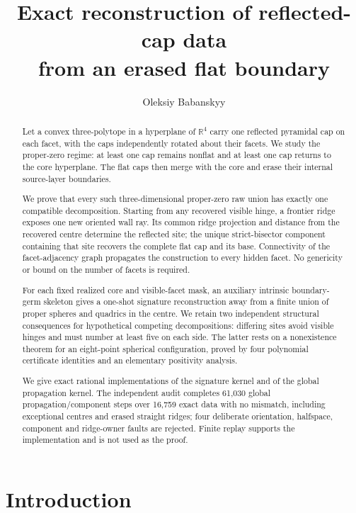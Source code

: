 \documentclass[11pt]{amsart}
\title[Reconstruction from an erased flat boundary]{Exact reconstruction of reflected-cap data\\from an erased flat boundary}
\author{Oleksiy Babanskyy}
\date{}
\theoremstyle{definition}
\newcommand{\R}{\mathbb{R}}
\begin{document}
\begin{abstract}
Let a convex three-polytope in a hyperplane of $\R^4$ carry one reflected
pyramidal cap on each facet, with the caps independently rotated about their
facets.  We study the proper-zero regime: at least one cap remains nonflat and
at least one cap returns to the core hyperplane.  The flat caps then merge with
the core and erase their internal source-layer boundaries.

We prove that every such three-dimensional proper-zero raw union has exactly
one compatible decomposition.  Starting from any recovered visible hinge, a
frontier ridge exposes one new oriented wall ray.  Its common ridge projection
and distance from the recovered centre determine the reflected site; the
unique strict-bisector component containing that site recovers the complete
flat cap and its base.  Connectivity of the facet-adjacency graph propagates
the construction to every hidden facet.  No genericity or bound on the number
of facets is required.

For each fixed realized core and visible-facet mask, an auxiliary intrinsic
boundary-germ skeleton gives a one-shot signature reconstruction away from a
finite union of proper spheres and quadrics in the centre.  We retain two
independent structural consequences for hypothetical competing
decompositions: differing sites avoid visible hinges and must number at least
five on each side.  The latter rests on a nonexistence theorem for an
eight-point spherical configuration, proved by four polynomial certificate
identities and an elementary positivity analysis.

We give exact rational implementations of the signature kernel and of the
global propagation kernel.  The independent audit completes 61,030 global
propagation/component steps over 16,759 exact data with no mismatch, including
exceptional centres and erased straight ridges; four deliberate orientation,
halfspace, component and ridge-owner faults are rejected.  Finite replay
supports the implementation and is not used as the proof.
\end{abstract}

\maketitle

\section{Introduction}
\end{document}
